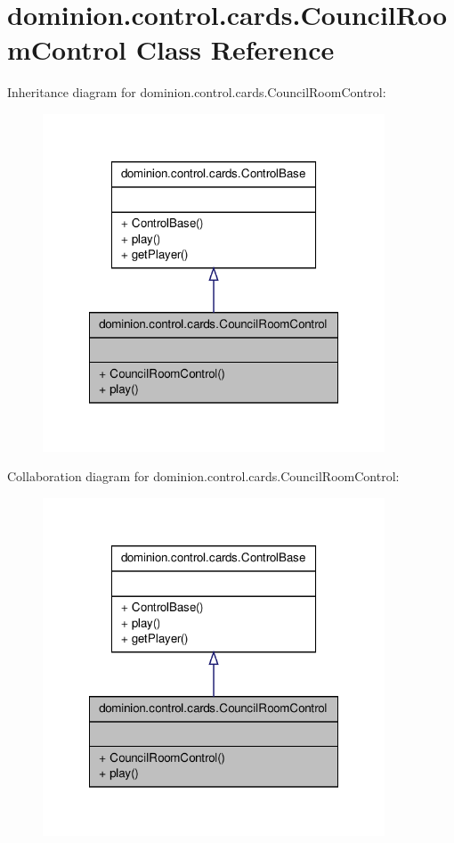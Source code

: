 \hypertarget{classdominion_1_1control_1_1cards_1_1CouncilRoomControl}{\section{dominion.\-control.\-cards.\-Council\-Room\-Control \-Class \-Reference}
\label{classdominion_1_1control_1_1cards_1_1CouncilRoomControl}
}


\-Inheritance diagram for dominion.\-control.\-cards.\-Council\-Room\-Control\-:
\nopagebreak
\begin{figure}[H]
\begin{center}
\leavevmode
\includegraphics[width=288pt]{classdominion_1_1control_1_1cards_1_1CouncilRoomControl__inherit__graph}
\end{center}
\end{figure}


\-Collaboration diagram for dominion.\-control.\-cards.\-Council\-Room\-Control\-:
\nopagebreak
\begin{figure}[H]
\begin{center}
\leavevmode
\includegraphics[width=288pt]{classdominion_1_1control_1_1cards_1_1CouncilRoomControl__coll__graph}
\end{center}
\end{figure}
